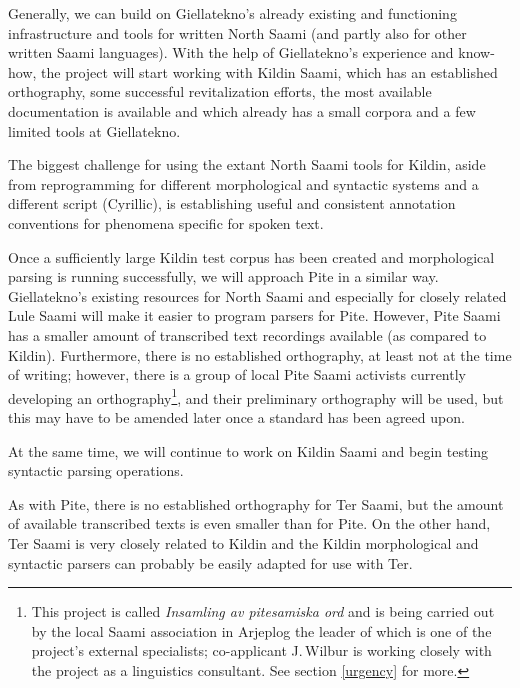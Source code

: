 \documentclass[a4paper,12pt]{article}
\begin{document}
Generally, we can build on Giellatekno's already existing and functioning infrastructure and tools for written North Saami (and partly also for other written Saami languages). With the help of Giellatekno's experience and know-how, the project will start working with Kildin Saami, which has an established orthography, some successful revitalization efforts, the most available documentation is available and which already has a small corpora and a few limited tools at Giellatekno.

The biggest challenge for using the extant North Saami tools for Kildin, aside from reprogramming for different morphological and syntactic systems and a different script (Cyrillic), is establishing useful and consistent annotation conventions for phenomena specific for spoken text.

Once a sufficiently large Kildin test corpus has been created and morphological parsing is running successfully, we will approach Pite in a similar way. Giellatekno's existing resources for North Saami and especially for closely related Lule Saami will make it easier to program parsers for Pite. However, Pite Saami has a smaller amount of transcribed text recordings available (as compared to Kildin). Furthermore, there is no established orthography, at least not at the time of writing; however, there is a group of local Pite Saami activists currently developing an orthography\footnote{This project is called {\it Insamling av pitesamiska ord} and is being carried out by the local Saami association in Arjeplog the leader of which is one of the project's external specialists; co-applicant J.\,Wilbur is working closely with the project as a linguistics consultant. See section \ref{urgency} for more.}, and their preliminary orthography will be used, but this may have to be amended later once a standard has been agreed upon.

At the same time, we will continue to work on Kildin Saami and begin testing syntactic parsing operations.

As with Pite, there is no established orthography for Ter Saami, but the amount of available transcribed texts is even smaller than for Pite.  On the other hand, Ter Saami is very closely related to Kildin and the Kildin morphological and syntactic parsers can probably be easily adapted for use with Ter.
\end{document}
